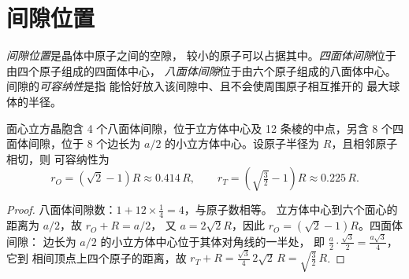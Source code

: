 \section{间隙位置}

\begin{definition}[间隙位置]\label{def:b1:crystals-metals:site}
\emph{间隙位置}是晶体中原子之间的空隙，
较小的原子可以占据其中。\emph{四面体间隙}位于
由四个原子组成的四面体中心，
\emph{八面体间隙}位于由六个原子组成的八面体中心。
间隙的\emph{可容纳性}是指
能恰好放入该间隙中、且不会使周围原子相互推开的
最大球体的半径。
\end{definition}

\begin{proposition}[面心立方结构的间隙]\label{prop:b1:crystals-metals:sites}
面心立方晶胞含 4 个八面体间隙，位于立方体中心及
12 条棱的中点，另含 8 个四面体间隙，位于
8 个边长为 $a/2$ 的小立方体中心。设原子半径为 $R$，且相邻原子相切，则
可容纳性为
\[
  r_O = (\sqrt2 - 1)R \approx 0.414\,R, \qquad
  r_T = \left(\sqrt{\tfrac32} - 1\right)R \approx 0.225\,R .
\]
\end{proposition}

\begin{proof}
八面体间隙数：$1 + 12 \times \frac14 = 4$，与原子数相等。
立方体中心到六个面心的距离为 $a/2$，故 $r_O + R = a/2$，
又 $a = 2\sqrt2 R$，因此 $r_O = (\sqrt2 - 1)R$。四面体间隙：
边长为 $a/2$ 的小立方体中心位于其体对角线的一半处，
即 $\frac{a}{2}\cdot\frac{\sqrt3}{2} = \frac{a\sqrt3}{4}$，它到
相间顶点上四个原子的距离，故 $r_T + R = \frac{\sqrt3}{4}\,2\sqrt2\,R =
\sqrt{\tfrac32}\,R$.
\end{proof}

